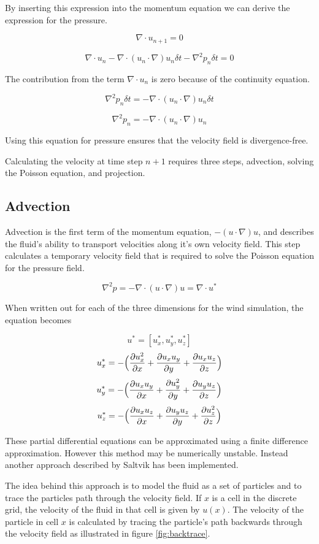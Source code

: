 By inserting this expression into the momentum equation we can derive the
expression for the pressure. 

$$ \nabla \cdot u_{n+1} = 0 $$

$$ \nabla \cdot u_n - \nabla \cdot (u_n \cdot \nabla)u_n \delta t - \nabla^2 p_n \delta t = 0 $$

The contribution from the term $ \nabla \cdot u_n $ is zero because of the continuity equation.

$$ \nabla^2 p_n \delta t = - \nabla \cdot (u_n \cdot \nabla)u_n \delta t $$

$$ \nabla^2 p_n = - \nabla \cdot (u_n \cdot \nabla)u_n $$

Using this equation for pressure ensures that the velocity field is divergence-free.

Calculating the velocity at time step $n+1$ requires three steps, advection, 
solving the Poisson equation, and projection.

\subsection{Advection}

Advection is the first term of the momentum equation, $-(u \cdot \nabla)u$, and
describes the fluid's ability to transport velocities along it's own velocity 
field. This step calculates a temporary velocity field that is required to solve
the Poisson equation for the pressure field.

$$ \nabla^2 p = - \nabla \cdot (u \cdot \nabla)u = \nabla \cdot u^* $$

When written out for each of the three dimensions for the wind simulation, the
equation becomes

$$ u^* = [u^*_x, u^*_y, u^*_z] $$
$$ u^*_x = - \Big( \frac{\partial u_x^2}{\partial x} + \frac{\partial u_x u_y}{\partial y} + \frac{\partial u_x u_z}{\partial z}\Big) $$
$$ u^*_y = - \Big( \frac{\partial u_x u_y}{\partial x} + \frac{\partial u_y^2}{\partial y} + \frac{\partial u_y u_z}{\partial z}\Big) $$
$$ u^*_z = - \Big( \frac{\partial u_x u_z}{\partial x} + \frac{\partial u_y u_z}{\partial y} + \frac{\partial u_z^2}{\partial z}\Big) $$

These partial differential equations can be approximated using a finite difference
approximation. However this method may be numerically unstable. Instead another
approach described by Saltvik\cite{originalSnowThesis} has been implemented.

The idea behind this approach is to model the fluid as a set of particles and to
trace the particles path through the velocity field. If $x$ is a cell in the
discrete grid, the velocity of the fluid in that cell is given by $u(x)$. The
velocity of the particle in cell $x$ is calculated by tracing the particle's path
backwards through the velocity field as illustrated in figure \ref{fig:backtrace}.

